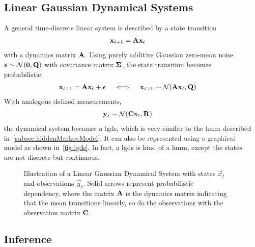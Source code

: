 		\subsection{Linear Gaussian Dynamical Systems}
			A general time-discrete linear system is described by a state transition
			\begin{align*}
				\boldsymbol{\mathrm{x}}_{t + 1} = \boldsymbol{\mathrm{A}} \boldsymbol{\mathrm{x}}_t
			\end{align*}
			with a dynamics matrix \(\boldsymbol{\mathrm{A}}\). Using purely additive Gaussian zero-mean noise \( \boldsymbol{\mathrm{\epsilon}} \sim \mathcal{N}(\boldsymbol{\mathrm{0}}, \boldsymbol{\mathrm{Q}}) \) with covariance matrix \( \boldsymbol{\mathrm{\Sigma}} \), the state transition becomes probabilistic:
			\begin{align*}
				\boldsymbol{\mathrm{x}}_{t + 1} = \boldsymbol{\mathrm{A}} \boldsymbol{\mathrm{x}}_t + \boldsymbol{\mathrm{\epsilon}} \quad\iff\quad \boldsymbol{\mathrm{x}}_{t + 1} \sim \mathcal{N}(\boldsymbol{\mathrm{A}} \boldsymbol{\mathrm{x}}_t, \boldsymbol{\mathrm{Q}})
			\end{align*}
			With analogous defined measurements,
			\begin{align*}
				\boldsymbol{\mathrm{y}}_t \sim \mathcal{N}(\boldsymbol{\mathrm{C}} \boldsymbol{\mathrm{x}}_t, \boldsymbol{\mathrm{R}})
			\end{align*}
			the dynamical system becomes a \ac{lgds}, which is very similar to the \ac{hmm} described in~\autoref{subsec:hiddenMarkovModel}. It can also be represented using a graphical model as shown in~\autoref{fig:lgds}. In fact, a \ac{lgds} is kind of a \ac{hmm}, except the states are not discrete but continuous.

			\begin{figure}
				\centering
				\tikzLinearGaussianDynamicalSystem
				\caption{Illustration of a Linear Gaussian Dynamical System with states \(\vec{x}_t\) and observations \(\vec{y}_t\). Solid arrows represent probabilistic dependency, where the matrix \(\boldsymbol{\mathrm{A}}\) is the dynamics matrix indicating that the mean transitions linearly, so do the observations with the observation matrix \(\boldsymbol{\mathrm{C}}\).}
				\label{fig:lgds}
			\end{figure}

		\subsection{Inference}

